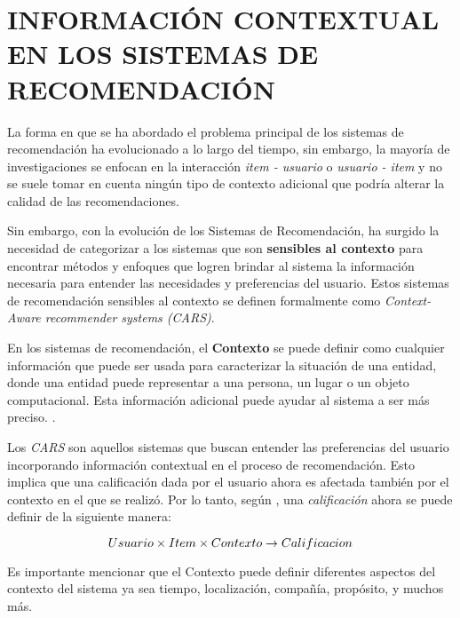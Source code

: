 \section{INFORMACIÓN CONTEXTUAL EN LOS SISTEMAS DE RECOMENDACIÓN}

La forma en que se ha abordado el problema principal de los sistemas de recomendación ha evolucionado a lo largo del tiempo, sin embargo, la mayoría de investigaciones se enfocan en la interacción \textit{item - usuario} o \textit{usuario - item} y no se suele tomar en cuenta ningún tipo de contexto adicional que podría alterar la calidad de las recomendaciones.

Sin embargo, con la evolución de los Sistemas de Recomendación, ha surgido la necesidad de categorizar a los sistemas que son \textbf{sensibles al contexto} para encontrar métodos y enfoques que logren brindar al sistema la información necesaria para entender las necesidades y preferencias del usuario. Estos sistemas de recomendación sensibles al contexto se definen formalmente como \textit{Context-Aware recommender systems (CARS)}. 

\begin{definition}

En los sistemas de recomendación, el \textbf{Contexto} se puede definir como cualquier información que puede ser usada para caracterizar la situación de una entidad, donde una entidad puede representar a una persona, un lugar o un objeto computacional. Esta información adicional puede ayudar al sistema a ser más preciso. \mbox{\parencite{mateos2024systematic}}.

\end{definition}

Los \textit{CARS} son aquellos sistemas que buscan entender las preferencias del usuario incorporando información contextual en el proceso de recomendación. Esto implica que una calificación dada por el usuario ahora es afectada también por el contexto en el que se realizó. Por lo tanto, según \parencite{10.5555/1941884}, una \textit{calificación} ahora se puede definir de la siguiente manera:

\begin{equation}
    Usuario \times Item \times Contexto \rightarrow Calificacion
    \addequation{Cálculo de Calificación mediante un Contexto}
\end{equation}

Es importante mencionar que el Contexto puede definir diferentes aspectos del contexto del sistema ya sea tiempo, localización, compañía, propósito, y muchos más. 

